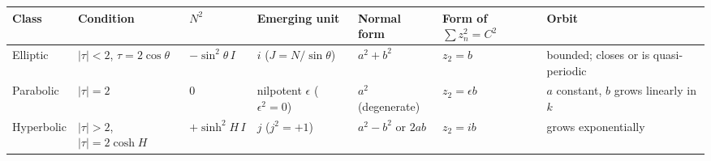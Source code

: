 \documentclass[
  a4paper,
]{article}
\newcounter{none} %
\begin{document}
{\def\LTcaptype{none} %
\begin{longtable}[]{@{}
  >{\raggedright\arraybackslash}p{}
  >{\raggedright\arraybackslash}p{}
  >{\raggedright\arraybackslash}p{}
  >{\raggedright\arraybackslash}p{}
  >{\raggedright\arraybackslash}p{}
  >{\raggedright\arraybackslash}p{}
  >{\raggedright\arraybackslash}p{}@{}}
\toprule\noalign{}
\begin{minipage}[b]{\linewidth}\raggedright
Class
\end{minipage} & \begin{minipage}[b]{\linewidth}\raggedright
Condition
\end{minipage} & \begin{minipage}[b]{\linewidth}\raggedright
\(N^2\)
\end{minipage} & \begin{minipage}[b]{\linewidth}\raggedright
Emerging unit
\end{minipage} & \begin{minipage}[b]{\linewidth}\raggedright
Normal form
\end{minipage} & \begin{minipage}[b]{\linewidth}\raggedright
Form of \(\sum z_n^2=C^2\)
\end{minipage} & \begin{minipage}[b]{\linewidth}\raggedright
Orbit
\end{minipage} \\
\midrule\noalign{}
\endhead
\bottomrule\noalign{}
\endlastfoot
Elliptic & \(\lvert\tau\rvert<2\), \(\tau=2\cos\theta\) &
\(-\sin^2\theta\,I\) & \(i\) (\(J=N/\sin\theta\)) & \(a^2+b^2\) &
\(z_2=b\) & bounded; closes or is quasi-periodic \\
Parabolic & \(\lvert\tau\rvert=2\) & \(0\) & nilpotent \(\epsilon\)
(\(\epsilon^2=0\)) & \(a^2\) (degenerate) & \(z_2=\epsilon b\) & \(a\)
constant, \(b\) grows linearly in \(k\) \\
Hyperbolic & \(\lvert\tau\rvert>2\), \(\lvert\tau\rvert=2\cosh H\) &
\(+\sinh^2H\,I\) & \(j\) (\(j^2=+1\)) & \(a^2-b^2\) or \(2ab\) &
\(z_2=ib\) & grows exponentially \\
\end{longtable}
}
\end{document}
